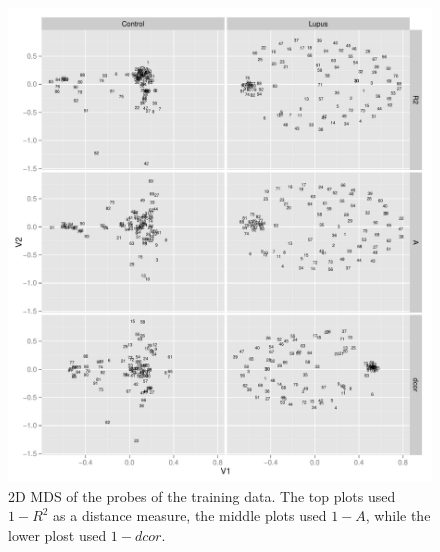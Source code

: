 \documentclass[a4paper, 12pt]{report}
\begin{document}

\begin{figure}[H]
\begin{center}
\includegraphics[width=\textwidth]{MDS.pdf}
\caption{2D MDS of the probes of the training data. The top plots used $1-R^2$ as a distance measure, the middle plots used $1 -  A$,  while the lower plost used $1 - dcor$.}
\label{F:MDS}
\end{center}
\end{figure}
\end{document}
